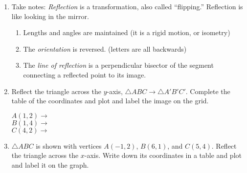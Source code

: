 \documentclass[12pt, twoside]{article}
\begin{document}
\begin{enumerate}
\newpage
\item Take notes: \emph{Reflection} is a transformation, also called ``flipping.'' Reflection is like looking in the mirror.
\begin{enumerate}
  \item Lengths and angles are maintained (it is a rigid motion, or isometry)
  \item The \emph{orientation} is reversed. (letters are all backwards)
  \item The \emph{line of reflection} is a perpendicular bisector of the segment connecting a reflected point to its image.
\end{enumerate}
\begin{flushright}
\end{flushright}

\newpage
\item Reflect the triangle across the $y$-axis, $\triangle ABC \rightarrow \triangle A'B'C'$. Complete the table of the coordinates and plot and label the image on the grid. \vspace{0.5cm}
\begin{multicols}{2}
  $A(1,2) \rightarrow$ \\[0.7cm]
  $B(1,4) \rightarrow$ \\[0.7cm]
  $C(4,2) \rightarrow$ \\[0.7cm]
  \end{multicols}

\newpage
\item $\triangle ABC$ is shown with vertices $A(-1,2)$, $B(6,1)$, and $C(5,4)$. Reflect the triangle across the $x$-axis. Write down its coordinates in a table and plot and label it on the graph.
  \begin{flushright}
    \end{flushright}


\end{enumerate}
\end{document}
